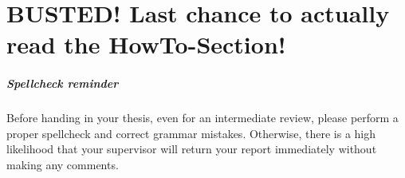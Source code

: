 
\ifLSRITRtutorial
	\chapter{BUSTED! Last chance to actually read the HowTo-Section!}
	
%	
%	
	
	
%	
%	

\paragraph{Spellcheck reminder}
Before handing in your thesis, even for an intermediate review, please perform a proper spellcheck and correct grammar mistakes. Otherwise, there is a high likelihood that your supervisor will return your report immediately without making any comments.
\fi


